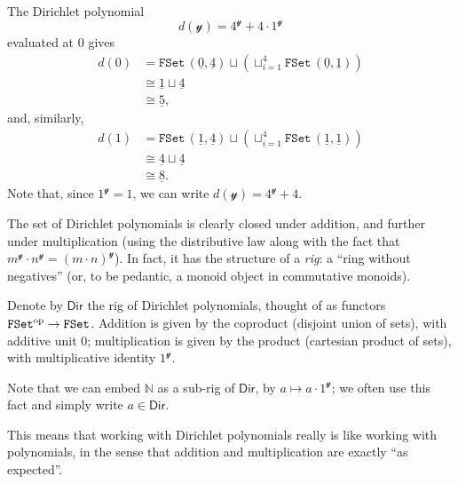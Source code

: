 \documentclass[11pt,fleqn]{article}
\newcommand{\yon}{\mathcal{y}}
\newcommand{\op}{^\textnormal{op}}
\newcommand{\cat}[1]{\mathtt{#1}}
\newcommand{\rig}[1]{\mathsf{#1}}
\newcommand{\FSet}{\cat{FSet}}
\newcommand{\Dir}{\rig{Dir}}
\begin{document}
\begin{example}
  The Dirichlet polynomial
  \[
    d(\yon) = 4^\yon + 4\cdot1^\yon
  \]
  evaluated at $0$ gives
  \[
    \begin{aligned}
      d(0)
      &= \FSet\,(\underline{0},\underline{4}) \sqcup \left( \sqcup_{i=1}^4 \FSet\,(\underline{0},\underline{1}) \right)
    \\&\cong \underline{1} \sqcup \underline{4}
    \\&\cong \underline{5},
    \end{aligned}
  \]
  and, similarly,
  \[
    \begin{aligned}
      d(1)
      &= \FSet\,(\underline{1},\underline{4}) \sqcup \left( \sqcup_{i=1}^4 \FSet\,(\underline{1},\underline{1}) \right)
    \\&\cong \underline{4} \sqcup \underline{4}
    \\&\cong \underline{8}.
    \end{aligned}
  \]
  Note that, since $1^\yon=1$, we can write $d(\yon)=4^\yon+4$.
\end{example}

The set of Dirichlet polynomials is clearly closed under addition, and further under multiplication (using the distributive law along with the fact that $m^\yon\cdot n^\yon=(m\cdot n)^\yon$).
In fact, it has the structure of a \emph{rig}: a ``ring without negatives'' (or, to be pedantic, a monoid object in commutative monoids).

\begin{definition}
  Denote by $\Dir$ the rig of Dirichlet polynomials, thought of as functors $\FSet\op\to\FSet$.
  Addition is given by the coproduct (disjoint union of sets), with additive unit $0$;
  multiplication is given by the product (cartesian product of sets), with multiplicative identity $1^\yon$.
  
  Note that we can embed $\mathbb{N}$ as a sub-rig of $\Dir$, by $a\mapsto a\cdot1^\yon$;
  we often use this fact and simply write $a\in\Dir$.
\end{definition}

This means that working with Dirichlet polynomials really is like working with polynomials, in the sense that addition and multiplication are exactly ``as expected''.
\end{document}
